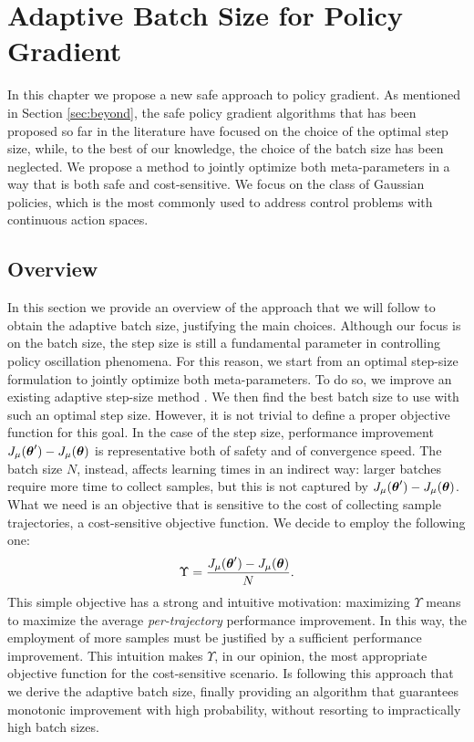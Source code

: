 \chapter{Adaptive Batch Size for Policy Gradient}\label{chap:main}
In this chapter we propose a new safe approach to policy gradient. As mentioned in Section \ref{sec:beyond}, the safe policy gradient algorithms that has been proposed so far in the literature have focused on the choice of the optimal step size, while, to the best of our knowledge, the choice of the batch size has been neglected. We propose a method to jointly optimize both meta-parameters in a way that is both safe and cost-sensitive. We focus on the class of Gaussian policies, which is the most commonly used to address control problems with continuous action spaces.



\section{Overview}
In this section we provide an overview of the approach that we will follow to obtain the adaptive batch size, justifying the main choices.
Although our focus is on the batch size, the step size is still a fundamental parameter in controlling policy oscillation phenomena. For this reason, we start from an optimal step-size formulation to jointly optimize both meta-parameters. To do so, we improve an existing adaptive step-size method \cite{Pirotta2013adaptive}. We then find the best batch size to use with such an optimal step size.
However, it is not trivial to define a proper objective function for this goal. In the case of the step size, performance improvement $J_{\mu}(\boldsymbol{\theta}') - J_{\mu}(\boldsymbol{\theta})$ is representative both of safety and of convergence speed. The batch size $N$, instead, affects learning times in an indirect way: larger batches require more time to collect samples, but this is not captured by $J_{\mu}(\boldsymbol{\theta}') - J_{\mu}(\boldsymbol{\theta})$. What we need is an objective that is sensitive to the cost of collecting sample trajectories, \ie a cost-sensitive objective function. We decide to employ the following one:
\[
	\Upsilon = \frac{J_{\mu}(\boldsymbol{\theta}') - J_{\mu}(\boldsymbol{\theta})}{N}.
\]
This simple objective has a strong and intuitive motivation: maximizing $\Upsilon$ means to maximize the average \textit{per-trajectory} performance improvement. In this way, the employment of more samples must be justified by a sufficient performance improvement. This intuition makes $\Upsilon$, in our opinion, the most appropriate objective function for the cost-sensitive scenario.
Is following this approach that we derive the adaptive batch size, finally providing an algorithm that guarantees monotonic improvement with high probability, without resorting to impractically high batch sizes.



